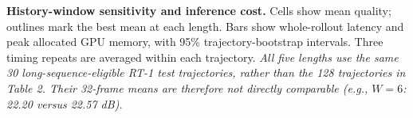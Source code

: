 \caption{\textbf{History-window sensitivity and inference cost.} Cells show mean quality; outlines mark the best mean at each length. Bars show whole-rollout latency and peak allocated GPU memory, with 95\% trajectory-bootstrap intervals. Three timing repeats are averaged within each trajectory. \emph{All five lengths use the same 30 long-sequence-eligible RT-1 test trajectories, rather than the 128 trajectories in Table 2. Their 32-frame means are therefore not directly comparable (e.g., $W=6$: 22.20 versus 22.57 dB).}}
